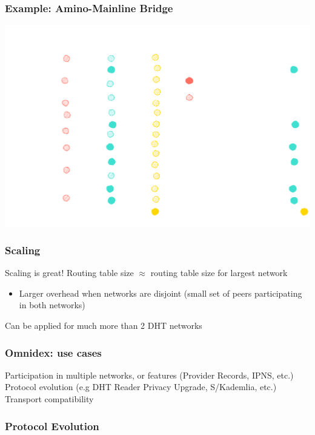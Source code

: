 \documentclass{../shipyard-slide}
\begin{document}
\begin{frame}
\frametitle{Example: Amino-Mainline Bridge}

\hspace{2cm}\includegraphics[scale=.13]{resources/rt3-1.png}


\end{frame}


\begin{frame}
\frametitle{Scaling}

\begin{itemize}
	\itemc Scaling is great!
	\itemc Routing table size $\approx$ routing table size for largest network \smiley
	\begin{itemize}
		\item[\greencube] Larger overhead when networks are disjoint (small set of peers participating in both networks)
	\end{itemize}
	\itemc Can be applied for much more than 2 DHT networks \smiley
\end{itemize}
\end{frame}

\begin{frame}
\frametitle{Omnidex: use cases}

\begin{itemize}
	\itemc Participation in multiple networks, or features (Provider Records, IPNS, etc.)
	\itemc Protocol evolution (e.g DHT Reader Privacy Upgrade, S/Kademlia, etc.)
	\itemc Transport compatibility
\end{itemize}
\end{frame}

\begin{frame}
\frametitle{Protocol Evolution}
\end{frame}
\end{document}
